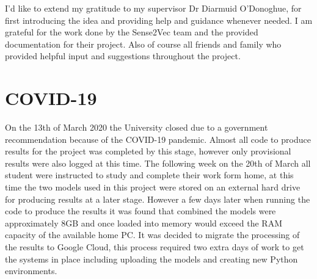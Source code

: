 I’d like to extend my gratitude to my supervisor Dr Diarmuid O'Donoghue, for first introducing the idea and providing help and guidance whenever needed. I am grateful for the work done by the Sense2Vec team and the provided documentation for their project. Also of course all friends and family who provided helpful input and suggestions throughout the project.

\section*{COVID-19}
On the 13th of March 2020 the University closed due to a government recommendation because of the COVID-19 pandemic. Almost all code to produce results for the project was completed by this stage, however only provisional results were also logged at this time. The following week on the 20th of March all student were instructed to study and complete their work form home, at this time the two models used in this project were stored on an external hard drive for producing results at a later stage. However a few days later when running the code to produce the results it was found that combined the models were approximately 8GB and once loaded into memory would exceed the RAM capacity of the available home PC. It was decided to migrate the processing of the results to Google Cloud, this process required two extra days of work to get the systems in place including uploading the models and creating new Python environments.